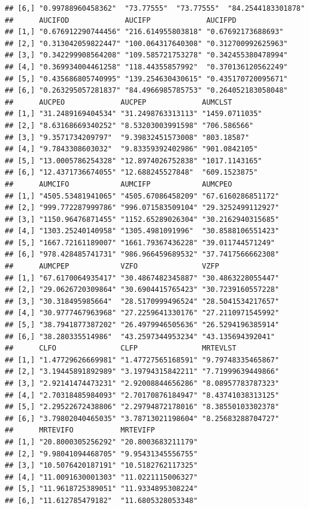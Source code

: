 \documentclass[12pt,]{krantz}
\theoremstyle{definition}
\theoremstyle{definition}
\theoremstyle{definition}
\theoremstyle{remark}
\begin{document}
\begin{verbatim}
## [6,] "0.99788960458362"  "73.77555"  "73.77555"  "84.2544183301878"
##      AUCIFOD             AUCIFP             AUCIFPD            
## [1,] "0.676912290744456" "216.614955803818" "0.67692173688693" 
## [2,] "0.313042059822447" "100.064317640308" "0.312700992625963"
## [3,] "0.342299908564208" "109.585721753278" "0.342455380478994"
## [4,] "0.369934004461258" "118.44355857992"  "0.370136120562249"
## [5,] "0.435686805740995" "139.254630430615" "0.435170720095671"
## [6,] "0.263295057281837" "84.4966985785753" "0.264052183058048"
##      AUCPEO             AUCPEP             AUMCLST       
## [1,] "31.2489169404534" "31.2498763313113" "1459.0711035"
## [2,] "8.63168669340252" "8.53203003991598" "706.586566"  
## [3,] "9.3571734209797"  "9.39832451573008" "803.18587"   
## [4,] "9.7843308603032"  "9.83359392402986" "901.0842105" 
## [5,] "13.0005786254328" "12.8974026752838" "1017.1143165"
## [6,] "12.4371736674055" "12.688245527848"  "609.1523875" 
##      AUMCIFO            AUMCIFP            AUMCPEO           
## [1,] "4505.53481941065" "4505.67086458209" "67.6160286851172"
## [2,] "999.772287999786" "996.071583509104" "29.3252499112927"
## [3,] "1150.96476871455" "1152.65289026304" "30.2162940315685"
## [4,] "1303.25240140958" "1305.4981091996"  "30.8588106551423"
## [5,] "1667.72161189007" "1661.79367436228" "39.011744571249" 
## [6,] "978.428485741731" "986.966459689532" "37.7417566662308"
##      AUMCPEP            VZFO               VZFP              
## [1,] "67.6170064935417" "30.4867482345887" "30.4863228055447"
## [2,] "29.0626720309864" "30.6904415765423" "30.7239160557228"
## [3,] "30.318495985664"  "28.5170999496524" "28.5041534217657"
## [4,] "30.9777467963968" "27.2259641330176" "27.2110971545992"
## [5,] "38.7941877387202" "26.4979946505636" "26.5294196385914"
## [6,] "38.280335514986"  "43.2597344953234" "43.135694392041" 
##      CLFO               CLFP               MRTEVLST          
## [1,] "1.47729626669981" "1.47727565168591" "9.79748335465867"
## [2,] "3.19445891892989" "3.19794315842211" "7.71999639449866"
## [3,] "2.92141474473231" "2.92008844656286" "8.08957783787323"
## [4,] "2.70318485984093" "2.70170876184947" "8.43741038313125"
## [5,] "2.29522672438806" "2.29794872178016" "8.38550103302378"
## [6,] "3.79802040465035" "3.78713021198604" "8.25683288704727"
##      MRTEVIFO           MRTEVIFP          
## [1,] "20.8000305256292" "20.8003683211179"
## [2,] "9.98041094468705" "9.95431345556755"
## [3,] "10.5076420187191" "10.5182762117325"
## [4,] "11.0091630001303" "11.0221115006327"
## [5,] "11.9618725389051" "11.9334895308224"
## [6,] "11.612785479182"  "11.6805328053348"
\end{verbatim}
\end{document}
